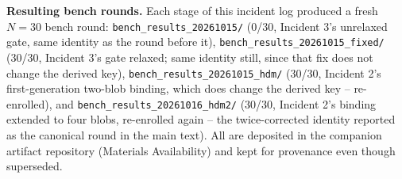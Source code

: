 \documentclass[12pt]{article}
\begin{document}
\textbf{Resulting bench rounds.} Each stage of this incident log produced a fresh $N=30$ bench round: \texttt{bench\_results\_20261015/} (0/30, Incident 3's unrelaxed gate, same identity as the round before it), \texttt{bench\_results\_20261015\_fixed/} (30/30, Incident 3's gate relaxed; same identity still, since that fix does not change the derived key), \texttt{bench\_results\_20261015\_hdm/} (30/30, Incident 2's first-generation two-blob binding, which does change the derived key -- re-enrolled), and \texttt{bench\_results\_20261016\_hdm2/} (30/30, Incident 2's binding extended to four blobs, re-enrolled again -- the twice-corrected identity reported as the canonical round in the main text). All are deposited in the companion artifact repository (Materials Availability) and kept for provenance even though superseded.



\end{document}
